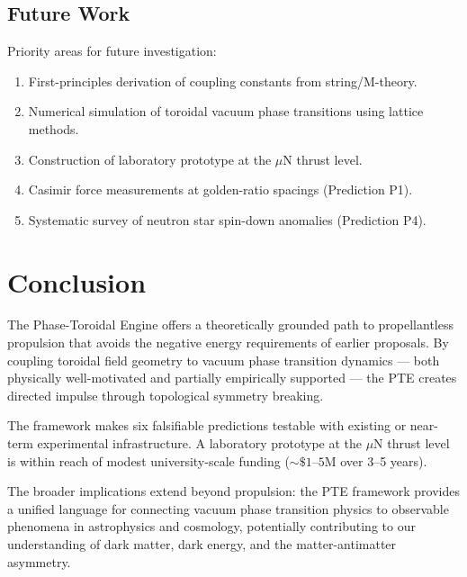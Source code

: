 \documentclass[12pt,a4paper]{article}
\begin{document}
\subsection{Future Work}

Priority areas for future investigation:

\begin{enumerate}
    \item First-principles derivation of coupling constants from string/M-theory.
    \item Numerical simulation of toroidal vacuum phase transitions using lattice methods.
    \item Construction of laboratory prototype at the $\mu$N thrust level.
    \item Casimir force measurements at golden-ratio spacings (Prediction P1).
    \item Systematic survey of neutron star spin-down anomalies (Prediction P4).
\end{enumerate}

\section{Conclusion}
\label{sec:conclusion}

The Phase-Toroidal Engine offers a theoretically grounded path to propellantless propulsion that avoids the negative energy requirements of earlier proposals. By coupling toroidal field geometry to vacuum phase transition dynamics --- both physically well-motivated and partially empirically supported --- the PTE creates directed impulse through topological symmetry breaking.

The framework makes six falsifiable predictions testable with existing or near-term experimental infrastructure. A laboratory prototype at the $\mu$N thrust level is within reach of modest university-scale funding ($\sim \$1$--$5$M over 3--5 years).

The broader implications extend beyond propulsion: the PTE framework provides a unified language for connecting vacuum phase transition physics to observable phenomena in astrophysics and cosmology, potentially contributing to our understanding of dark matter, dark energy, and the matter-antimatter asymmetry.

\end{document}
